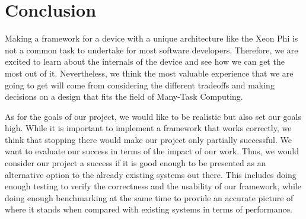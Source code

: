 \documentclass[10pt, conference, compsocconf]{IEEEtran}
\begin{document}
\section{Conclusion}
Making a framework for a device with a unique architecture like the Xeon Phi is not a common task to undertake for most software developers. Therefore, we are excited to learn about the internals of the device and see how we can get the most out of it. Nevertheless, we think the most valuable experience that we are going to get will come from considering the different tradeoffs and making decisions on a design that fits the field of Many-Task Computing.

As for the goals of our project, we would like to be realistic but also set our goals high. While it is important to implement a framework that works correctly, we think that stopping there would make our project only partially successful. We want to evaluate our success in terms of the impact of our work. Thus, we would consider our project a success if it is good enough to be presented as an alternative option to the already existing systems out there. This includes doing enough testing to verify the correctness and  the usability of our framework, while doing enough benchmarking at the same time to provide an accurate picture of where it stands when compared with existing systems in terms of performance.

%
%

\end{document}
